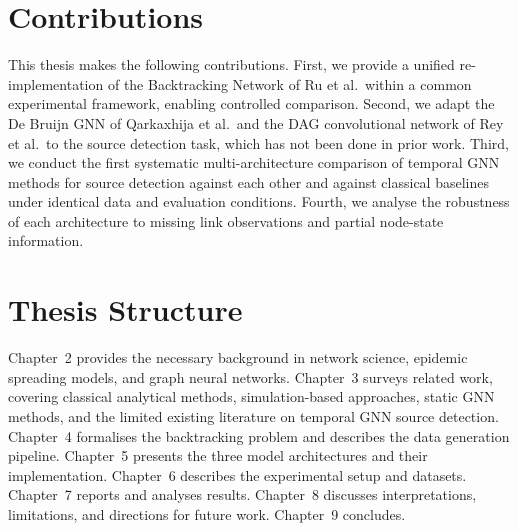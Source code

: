 \section{Contributions}
\label{sec:intro-contributions}

This thesis makes the following contributions. First, we provide a unified re-implementation of the Backtracking Network of Ru et al.\ within a common experimental framework, enabling controlled comparison. Second, we adapt the De Bruijn GNN of Qarkaxhija et al.\ and the DAG convolutional network of Rey et al.\ to the source detection task, which has not been done in prior work. Third, we conduct the first systematic multi-architecture comparison of temporal GNN methods for source detection against each other and against classical baselines under identical data and evaluation conditions. Fourth, we analyse the robustness of each architecture to missing link observations and partial node-state information.

\section{Thesis Structure}
\label{sec:intro-structure}

Chapter~2 provides the necessary background in network science, epidemic spreading models, and graph neural networks. Chapter~3 surveys related work, covering classical analytical methods, simulation-based approaches, static GNN methods, and the limited existing literature on temporal GNN source detection. Chapter~4 formalises the backtracking problem and describes the data generation pipeline. Chapter~5 presents the three model architectures and their implementation. Chapter~6 describes the experimental setup and datasets. Chapter~7 reports and analyses results. Chapter~8 discusses interpretations, limitations, and directions for future work. Chapter~9 concludes.
